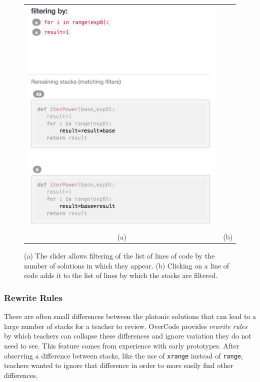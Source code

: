\documentclass[12pt,twoside]{mitthesis}
\newcommand \codevar[1]{\texttt{#1}}
\begin{document}
\begin{figure}[htpb]
\begin{tabular}{c | c}
\begin{minipage}{.52\linewidth}
\includegraphics[scale=0.40]{Body/figures/overcode/lineFilter.png}
\end{minipage}
\\
(a) & (b)
\end{tabular}
\caption{(a) The slider allows filtering of the list of lines of code by the number of solutions in which they appear. (b) Clicking on a line of code adds it to the list of lines by which the stacks are filtered.}
\label{linefilter}
\end{figure}

\subsubsection{Rewrite Rules} There are often small differences between the platonic solutions that can lead to a large number of stacks for a teacher to review. OverCode provides \emph{rewrite rules} by which teachers can collapse these differences and ignore variation they do not need to see. This feature comes from experience with early prototypes. After observing a difference between stacks, like the use of \codevar{xrange} instead of \codevar{range}, teachers wanted to ignore that difference in order to more easily find other differences.
\end{document}
